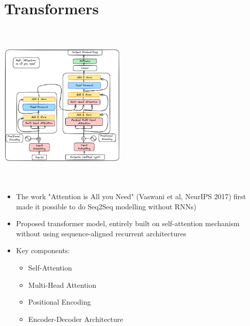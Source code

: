 \documentclass{article}
\begin{document}
\section{Transformers}
\begin{minipage}{0.5\textwidth}
\includegraphics[width=6cm, height=8cm]{Transformer/Images/Transformers1.png}
\end{minipage}
\begin{minipage}{0.5\textwidth}
\begin{itemize}
    \item The work "Attention is All you Need" (Vaswani et al, NeurIPS 2017) first made it possible to do Seq2Seq modelling without RNNs)
    \item Proposed transformer model, entirely built on self-attention mechanism without using sequence-aligned recurrent architectures
    \item Key components:
    \begin{itemize}
        \item Self-Attention
        \item Multi-Head Attention
        \item Positional Encoding
        \item Encoder-Decoder Architecture
    \end{itemize}
\end{itemize}
\end{minipage}
\end{document}
